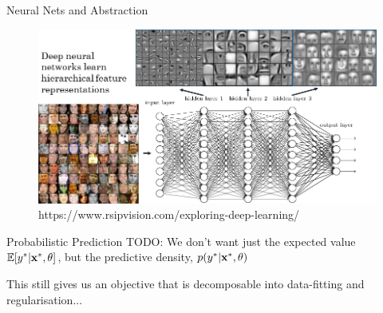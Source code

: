 \documentclass[lualatex, aspectratio=169]{beamer}
\begin{document}
\begin{frame}{Neural Nets and Abstraction}

  \begin{figure}
    \includegraphics[width=0.7\pagewidth]{assets/abstraction.png}
    \caption{https://www.rsipvision.com/exploring-deep-learning/}
  \end{figure}

\end{frame}









\begin{frame}{Probabilistic Prediction}
  TODO: We don't want just the expected value $\mathbb{E}\!\left[{{y}^{*} | {\mathbf{x}}^{*}, \theta}\right]$, but the predictive density, $p({y}^{*} | {\mathbf{x}}^{*}, \theta)$


  This still gives us an objective that is decomposable into data-fitting and regularisation...
\end{frame}
\end{document}
